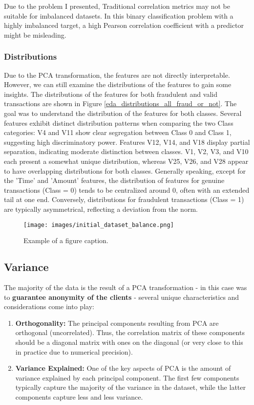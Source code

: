 Due to the problem I presented, Traditional correlation metrics may not be suitable for imbalanced datasets. In this binary classification problem with a highly imbalanced target, a high Pearson correlation coefficient with a predictor might be misleading.

\subsubsection{Distributions}

Due to the PCA transformation, the features are not directly interpretable. However, we can still examine the distributions of the features to gain some insights.
The distributions of the features for both fraudulent and valid transactions are shown in Figure \ref{eda_distributions_all_fraud_or_not}.
The goal was to understand the distribution of the features for both classes.
Several features exhibit distinct distribution patterns when comparing the two Class categories: V4 and V11 show clear segregation between Class 0 and Class 1, suggesting high discriminatory power.
Features V12, V14, and V18 display partial separation, indicating moderate distinction between classes. V1, V2, V3, and V10 each present a somewhat unique distribution, whereas V25, V26, and V28 appear to have overlapping distributions for both classes.
Generally speaking, except for the 'Time' and 'Amount' features, the distribution of features for genuine transactions (Class = 0) tends to be centralized around 0, often with an extended tail at one end.
Conversely, distributions for fraudulent transactions (Class = 1) are typically asymmetrical, reflecting a deviation from the norm.



\begin{figure}[htbp]
    \centerline{\texttt{[image: images/initial\_dataset\_balance.png]}}
    \caption{Example of a figure caption.}
    \label{initial_dataset_balance}
\end{figure}


\subsection{Variance}


The majority of the data is the result of a PCA transformation - in this case was to \textbf{guarantee anonymity of the clients} - several unique characteristics and considerations come into play:

\begin{enumerate}
    \item \textbf{Orthogonality:} The principal components resulting from PCA are orthogonal (uncorrelated). Thus, the correlation matrix of these components should be a diagonal matrix with ones on the diagonal (or very close to this in practice due to numerical precision).

    \item \textbf{Variance Explained:} One of the key aspects of PCA is the amount of variance explained by each principal component. The first few components typically capture the majority of the variance in the dataset, while the latter components capture less and less variance.
\end{enumerate}

